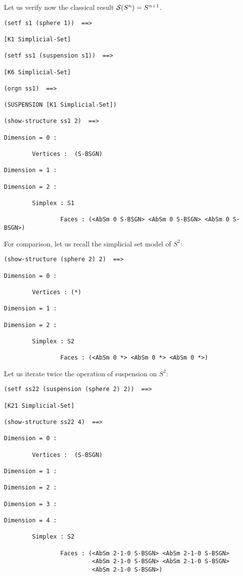 Let us verify now the classical result ${\cal S}(S^n)=S^{n+1}$.
{\footnotesize\begin{verbatim}
(setf s1 (sphere 1))  ==>

[K1 Simplicial-Set]

(setf ss1 (suspension s1))  ==>

[K6 Simplicial-Set]

(orgn ss1)  ==>

(SUSPENSION [K1 Simplicial-Set])

(show-structure ss1 2)  ==>

Dimension = 0 :

        Vertices :  (S-BSGN)

Dimension = 1 :

Dimension = 2 :

        Simplex : S1

                Faces : (<AbSm 0 S-BSGN> <AbSm 0 S-BSGN> <AbSm 0 S-BSGN>)
\end{verbatim}}
For comparison, let us recall the simplicial set model of $S^2$:
{\footnotesize\begin{verbatim}
(show-structure (sphere 2) 2)  ==>

Dimension = 0 :

        Vertices : (*)

Dimension = 1 :

Dimension = 2 :

        Simplex : S2

                Faces : (<AbSm 0 *> <AbSm 0 *> <AbSm 0 *>)
\end{verbatim}}
Let us iterate twice the operation of suspension on $S^2$:
{\footnotesize\begin{verbatim}
(setf ss22 (suspension (sphere 2) 2))  ==>

[K21 Simplicial-Set]

(show-structure ss22 4)  ==>

Dimension = 0 :

        Vertices :  (S-BSGN)

Dimension = 1 :

Dimension = 2 :

Dimension = 3 :

Dimension = 4 :

        Simplex : S2

                Faces : (<AbSm 2-1-0 S-BSGN> <AbSm 2-1-0 S-BSGN> 
                         <AbSm 2-1-0 S-BSGN> <AbSm 2-1-0 S-BSGN> 
                         <AbSm 2-1-0 S-BSGN>)
\end{verbatim}}
